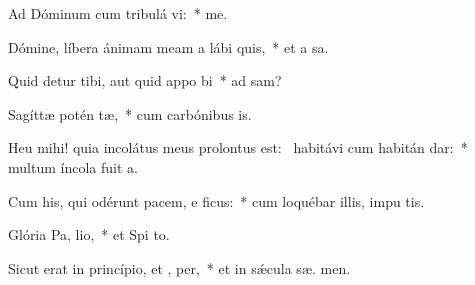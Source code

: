 \item Ad Dóminum cum tribulá vi:~*   me.
\item Dómine, líbera ánimam meam a lábi quis,~* et a  sa.
\item Quid detur tibi, aut quid appo bi~* ad  sam?
\item Sagíttæ potén tæ,~* cum carbónibus is.
\item Heu mihi! quia incolátus meus prolontus est:~\pscross{} habitávi cum habitán dar:~* multum íncola fuit  a.
\item Cum his, qui odérunt pacem, e ficus:~* cum loquébar illis, impu  tis.
\item Glória Pa,  lio,~* et Spi to.
\item Sicut erat in princípio, et ,  per,~* et in sǽcula sæ. men.
